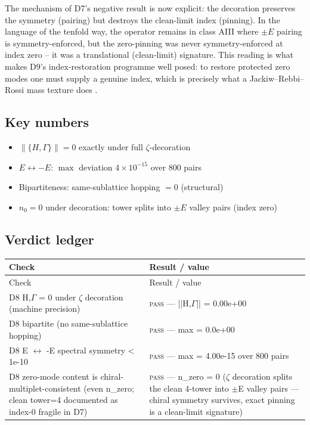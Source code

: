 \documentclass[11pt,a4paper]{article}
\begin{document}
The mechanism of D7's negative result is now explicit: the decoration preserves the symmetry (pairing) but destroys the clean-limit index (pinning). In the language of the tenfold way, the operator remains in class AIII where $\pm E$ pairing is symmetry-enforced, but the zero-pinning was never symmetry-enforced at index zero -- it was a translational (clean-limit) signature. This reading is what makes D9's index-restoration programme well posed: to restore protected zero modes one must supply a genuine index, which is precisely what a Jackiw--Rebbi--Rossi mass texture does \cite{jackiwrebbi,jackiwrossi}.

\subsection{Key numbers}
\begin{tcolorbox}[colback=labblue!6, colframe=labblue!70!black, boxrule=0.6pt, title={Key results (canonical run)}]
\begin{itemize}[leftmargin=1.2em, itemsep=0.15em]
\item $\|\{H, \Gamma\}\| = 0$ exactly under full $\zeta$-decoration
\item $E \leftrightarrow -E$: $\max$ deviation $4\times10^{-15}$ over 800 pairs
\item Bipartiteness: same-sublattice hopping $= 0$ (structural)
\item $n_0 = 0$ under decoration: tower splits into $\pm E$ valley pairs (index zero)
\end{itemize}
\end{tcolorbox}

\subsection{Verdict ledger}
\begin{longtable}{@{}p{}p{}@{}}
\toprule
Check & Result / value \\
\midrule
\endfirsthead
\toprule
Check & Result / value \\
\midrule
\endhead
\bottomrule
\endfoot
D8 {H,$\Gamma$} = 0 under $\zeta$ decoration (machine precision) & \textsc{pass} --- ||{H,$\Gamma$}|| = 0.00e+00 \\
D8 bipartite (no same-sublattice hopping) & \textsc{pass} --- max = 0.0e+00 \\
D8 E $\leftrightarrow$ -E spectral symmetry < 1e-10 & \textsc{pass} --- max = 4.00e-15 over 800 pairs \\
D8 zero-mode content is chiral-multiplet-consistent (even n\_zero; clean tower=4 documented as index-0 fragile in D7) & \textsc{pass} --- n\_zero = 0 ($\zeta$ decoration splits the clean 4-tower into $\pm$E valley pairs — chiral symmetry survives, exact pinning is a clean-limit signature) \\
\end{longtable}
\end{document}

